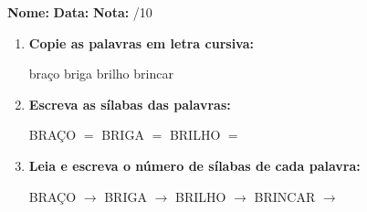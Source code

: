 \begin{exercicio}



\noindent\textbf{Nome:} \underline{\hspace{3.2cm}} \quad \textbf{Data:} \underline{\hspace{1.6cm}} \quad \textbf{Nota:} \underline{\hspace{0.9cm}}/10


\begin{enumerate}

  \item \textbf{Copie as palavras em letra cursiva:}
  \begin{center}
  braço \quad briga \quad brilho \quad brincar
  \end{center}
  \begin{center}
  \underline{\hspace{2.4cm}} \quad \underline{\hspace{2.4cm}} \quad \underline{\hspace{2.4cm}} \quad \underline{\hspace{2.4cm}}
  \end{center}

  \item \textbf{Escreva as sílabas das palavras:}
  \begin{center}
  BRAÇO $=$ \underline{\hspace{1.5cm}} \underline{\hspace{1.5cm}} \quad BRIGA $=$ \underline{\hspace{1.5cm}} \underline{\hspace{1.5cm}} \quad BRILHO $=$ \underline{\hspace{1.5cm}} \underline{\hspace{1.5cm}}
  \end{center}

  \item \textbf{Leia e escreva o número de sílabas de cada palavra:}
  \begin{center}
  BRAÇO $\rightarrow$ \underline{\hspace{0.9cm}} \quad BRIGA $\rightarrow$ \underline{\hspace{0.9cm}} \quad BRILHO $\rightarrow$ \underline{\hspace{0.9cm}} \quad BRINCAR $\rightarrow$ \underline{\hspace{0.9cm}}
  \end{center}


\end{enumerate}
\end{exercicio}

